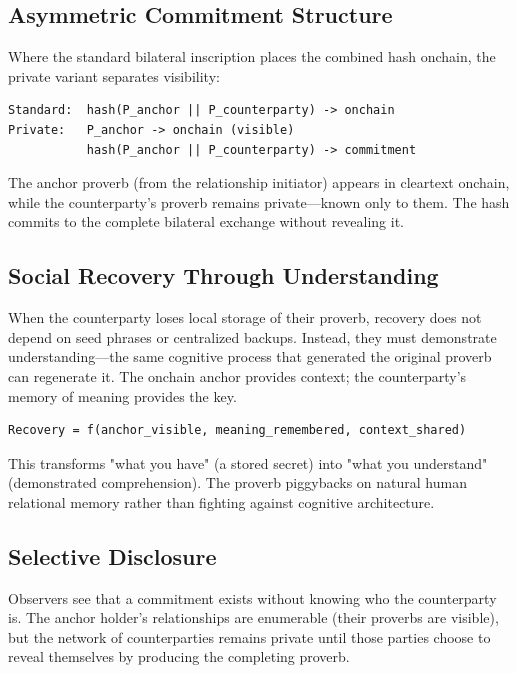 \documentclass[11pt,a4paper]{article}
\theoremstyle{definition}
\begin{document}
\subsection{Asymmetric Commitment Structure}

Where the standard bilateral inscription places the combined hash onchain, the private variant separates visibility:

\begin{verbatim}
Standard:  hash(P_anchor || P_counterparty) -> onchain
Private:   P_anchor -> onchain (visible)
           hash(P_anchor || P_counterparty) -> commitment
\end{verbatim}

The anchor proverb (from the relationship initiator) appears in cleartext onchain, while the counterparty's proverb remains private---known only to them. The hash commits to the complete bilateral exchange without revealing it.

\subsection{Social Recovery Through Understanding}

When the counterparty loses local storage of their proverb, recovery does not depend on seed phrases or centralized backups. Instead, they must demonstrate understanding---the same cognitive process that generated the original proverb can regenerate it. The onchain anchor provides context; the counterparty's memory of meaning provides the key.

\begin{verbatim}
Recovery = f(anchor_visible, meaning_remembered, context_shared)
\end{verbatim}

This transforms "what you have" (a stored secret) into "what you understand" (demonstrated comprehension). The proverb piggybacks on natural human relational memory rather than fighting against cognitive architecture.

\subsection{Selective Disclosure}

Observers see that a commitment exists without knowing who the counterparty is. The anchor holder's relationships are enumerable (their proverbs are visible), but the network of counterparties remains private until those parties choose to reveal themselves by producing the completing proverb.
\end{document}
